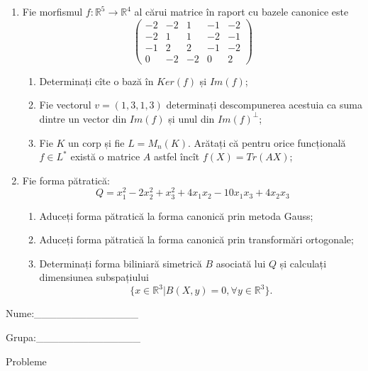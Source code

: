 \documentclass{article}
\begin{document}
\begin{enumerate}
 \item Fie morfismul $f:\mathbb{R}^5 \to \mathbb{R}^4$ al cărui matrice în raport cu bazele canonice este
$$\begin{pmatrix}
-2&-2&1&-1&-2\\
-2&1&1&-2&-1\\
-1&2&2&-1&-2\\
0&-2&-2&0&2
\end{pmatrix}$$

\begin{enumerate}
\item Determinați cîte o bază în $Ker(f)$ și $Im(f)$;
\item Fie vectorul $v=(1,3,1,3)$ determinați descompunerea acestuia ca suma dintre un vector din $Im(f)$ și unul din $Im(f)^\perp$;
\item Fie $K$ un corp și fie $L=M_n(K)$. Arătați că pentru orice funcțională $f \in L^*$ există o matrice $A$ astfel încît $f(X)=Tr(AX)$;
\end{enumerate}
\item Fie forma pătratică:
$$Q= x_1^2-2x_2^2+x_3^2+4x_1x_2-10x_1x_3+4x_2x_3$$

\begin{enumerate}
\item Aduceți forma pătratică la forma canonică prin metoda Gauss;
\item Aduceți forma pătratică la forma canonică prin transformări ortogonale;
\item Determinați forma biliniară simetrică $B$ asociată lui $Q$ și calculați dimensiunea subspațiului
$$\{x \in \mathbb{R}^3 | B(X,y)=0,\forall y \in \mathbb{R}^3\}.$$

\end{enumerate}
\end{enumerate}
\newpage
\begin{flushright}
Nume:\_\_\_\_\_\_\_\_\_\_\_\_\_\_
 
 
Grupa:\_\_\_\_\_\_\_\_\_\_\_\_\_\_
\end{flushright}
\begin{center}
\vspace{2cm}
{\Large Probleme}
\vspace{2cm}
\end{center}
\end{document}

